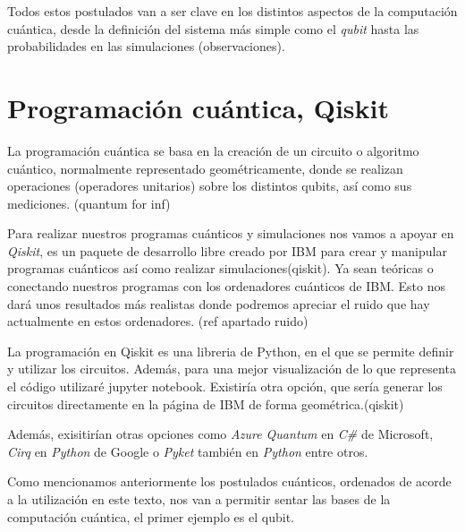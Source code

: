 Todos estos postulados van a ser clave en los distintos aspectos de la computación cuántica, desde la definición del sistema más simple como el \textit{qubit} hasta las probabilidades en las simulaciones (observaciones).

\vspace{15pt}
\section{Programación cuántica, Qiskit}
 La programación cuántica se basa en la creación de un circuito o algoritmo cuántico, normalmente representado geométricamente, donde se realizan operaciones (operadores unitarios) sobre los distintos qubits, así como sus mediciones. (quantum for inf)\newline

 Para realizar nuestros programas cuánticos y simulaciones nos vamos a apoyar en \textit{Qiskit}, es un paquete de desarrollo libre creado por IBM para crear y manipular programas cuánticos así como realizar simulaciones(qiskit). Ya sean teóricas o conectando nuestros programas con los ordenadores cuánticos de IBM. Esto nos dará unos resultados más realistas donde podremos apreciar el ruido que hay actualmente en estos ordenadores. (ref apartado ruido) \newline
 
 La programación en Qiskit es una libreria de Python, en el que se permite definir y utilizar los circuitos. Además, para una mejor visualización de lo que representa el código utilizaré jupyter notebook. Existiría otra opción, que sería generar los circuitos directamente en la página de IBM de forma geométrica.(qiskit) \newline

 Además, exisitirían otras opciones como \textit{Azure Quantum} en \textit{C\#} de Microsoft, \textit{Cirq} en \textit{Python} de Google o \textit{Pyket} también en \textit{Python} entre otros.
 
 Como mencionamos anteriormente los postulados cuánticos, ordenados de acorde a la utilización en este texto, nos van a permitir sentar las bases de la computación cuántica, el primer ejemplo es el qubit. \newline
 
